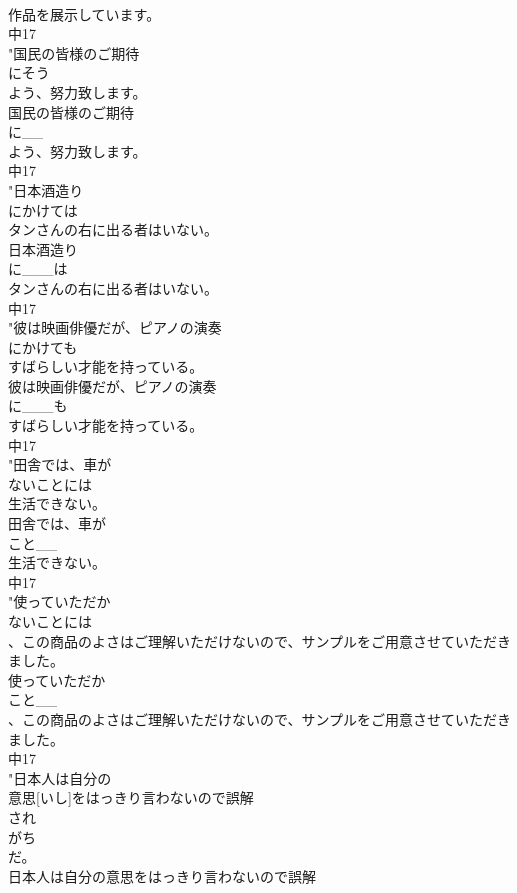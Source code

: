 \documentclass[8pt]{extreport}
\begin{document}
\begin{CJK}{UTF8}{min}
\\	作品を展示しています。
\\	中17
\\	"国民の皆様のご期待
\\	にそう
\\	よう、努力致します。
\\	国民の皆様のご期待
\\	に__
\\	よう、努力致します。
\\	中17
\\	"日本酒造り
\\	にかけては
\\	タンさんの右に出る者はいない。
\\	日本酒造り
\\	に___は
\\	タンさんの右に出る者はいない。
\\	中17
\\	"彼は映画俳優だが、ピアノの演奏
\\	にかけても
\\	すばらしい才能を持っている。
\\	彼は映画俳優だが、ピアノの演奏
\\	に___も
\\	すばらしい才能を持っている。
\\	中17
\\	"田舎では、車が
\\	ないことには
\\	生活できない。
\\	田舎では、車が
\\	こと__
\\	生活できない。
\\	中17
\\	"使っていただか
\\	ないことには
\\	、この商品のよさはご理解いただけないので、サンプルをご用意させていただきました。
\\	使っていただか
\\	こと__
\\	、この商品のよさはご理解いただけないので、サンプルをご用意させていただきました。
\\	中17
\\	"日本人は自分の
\\	意思[いし]をはっきり言わないので誤解
\\	され
\\	がち
\\	だ。
\\	日本人は自分の意思をはっきり言わないので誤解

\end{CJK}
\end{document}

